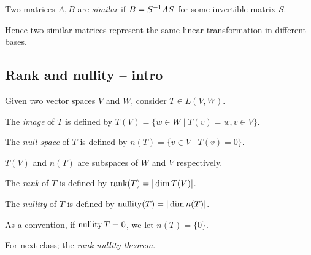 \begin{definition}
  Two matrices $A,B$ are \emph{similar} if $B=S^{-1} A S$ for some invertible matrix $S$.
\end{definition}

Hence two similar matrices represent the same linear transformation in different bases.

\subsection{Rank and nullity -- intro}

Given two vector spaces $V$ and $W$, consider $T\in L(V,W)$.

\begin{definition}
  The \emph{image} of $T$ is defined by $T(V)=\{w\in W\mid T(v)=w, v\in V\}$.

  The \emph{null space} of $T$ is defined by $n(T)=\{v\in V\mid T(v)=0\}$.
\end{definition}

\begin{lemma}
  $T(V)$ and $n(T)$ are subspaces of $W$ and $V$ respectively.
\end{lemma}

\begin{definition}
  The \emph{rank} of $T$ is defined by $\operatorname{rank}(T)=|\dim T(V)|$.

  The \emph{nullity} of $T$ is defined by $\operatorname{nullity}(T)=|\dim n(T)|$.
\end{definition}

As a convention, if $\operatorname{nullity} T=0$, we let $n(T)=\{0\}$.

For next class; the \emph{rank-nullity theorem}.
